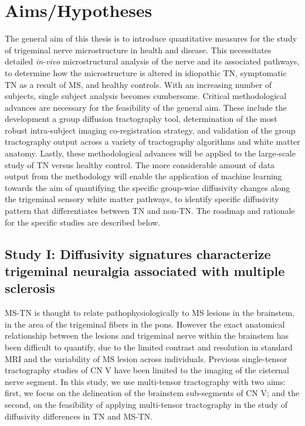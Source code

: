 \chapter{Aims/Hypotheses}

The general aim of this thesis is to introduce quantitative measures for the study of trigeminal nerve microstructure in health and disease. This necessitates detailed \textit{in-vivo} microstructural analysis of the nerve and its associated pathways, to determine how the microstructure is altered in idiopathic TN, symptomatic TN as a result of MS, and healthy controls. With an increasing number of subjects, single subject analysis becomes cumbersome. Critical methodological advances are necessary for the feasibility of the general aim. These include the development a group diffusion tractography tool, determination of the most robust intra-subject imaging co-registration strategy, and validation of the group tractography output across a variety of tractography algorithms and white matter anatomy. Lastly, these methodological advances will be applied to the large-scale study of TN versus healthy control.  The more considerable amount of data output from the methodology will enable the application of machine learning towards the aim of quantifying the specific group-wise diffusivity changes along the trigeminal sensory white matter pathways, to identify specific diffusivity pattern that differentiates between TN and non-TN. The roadmap and rationale for the specific studies are described below.

\section{Study I: Diffusivity signatures characterize trigeminal neuralgia associated with multiple sclerosis}
MS-TN is thought to relate pathophysiologically to MS lesions in the brainstem, in the area of the trigeminal fibers in the pons. However the exact anatomical relationship between the lesions and trigeminal nerve within the brainstem has been difficult to quantify, due to the limited contrast and resolution in standard MRI and the variability of MS lesion across individuals. Previous single-tensor tractography studies of CN V have been limited to the imaging of the cisternal nerve segment. In this study, we use multi-tensor tractography with two aims: first, we focus on the delineation of the brainstem sub-segments of CN V; and the second, on the feasibility of applying multi-tensor tractography in the study of diffusivity differences in TN and MS-TN. 

